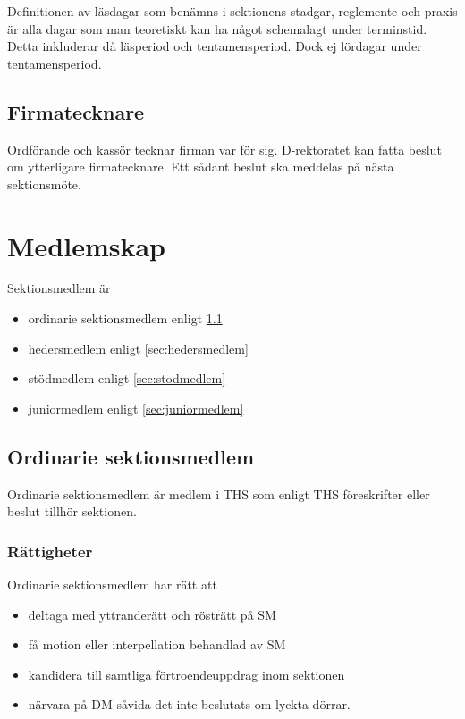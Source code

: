 \documentclass[a4paper,12pt]{article}
\begin{document}
Definitionen av läsdagar som benämns i sektionens stadgar, reglemente och praxis är alla dagar som man teoretiskt kan ha något schemalagt under terminstid. Detta inkluderar då läsperiod och tentamensperiod. Dock ej lördagar under tentamensperiod.

\subsection{Firmatecknare}

Ordförande och kassör tecknar firman var för sig. D-rektoratet kan fatta beslut om ytterligare firmatecknare. Ett sådant beslut ska meddelas på nästa sektionsmöte.

\section{Medlemskap}

Sektionsmedlem är

\begin{itemize}
  \item ordinarie sektionsmedlem enligt \ref{sec:ordinariesektionsmedlem}
  \item hedersmedlem enligt \ref{sec:hedersmedlem}
  \item stödmedlem enligt \ref{sec:stodmedlem}
  \item juniormedlem enligt \ref{sec:juniormedlem}
\end{itemize}

\subsection{Ordinarie sektionsmedlem}
\label{sec:ordinariesektionsmedlem}

Ordinarie sektionsmedlem är medlem i THS som enligt THS föreskrifter eller beslut tillhör sektionen.

\subsubsection{Rättigheter}

Ordinarie sektionsmedlem har rätt att

\begin{itemize}
  \item deltaga med yttranderätt och rösträtt på SM
  \item få motion eller interpellation behandlad av SM
  \item kandidera till samtliga förtroendeuppdrag inom sektionen
  \item närvara på DM såvida det inte beslutats om lyckta dörrar.
\end{itemize}
\end{document}
